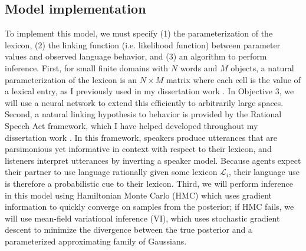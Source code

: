 \subsection{Model implementation}
To implement this model, we must specify (1) the parameterization of the lexicon, (2) the linking function (i.e. likelihood function) between parameter values and observed language behavior, and (3) an algorithm to perform inference.
First, for small finite domains with $N$ words and $M$ objects, a natural parameterization of the lexicon is an $N\times M$ matrix where each cell is the value of a lexical entry, as I previously used in my dissertation work \cite{hawkins_emerging_abstractions_2018}. 
In Objective 3, we will use a neural network to extend this efficiently to arbitrarily large spaces.
Second, a natural linking hypothesis to behavior is provided by the Rational Speech Act framework, which I have helped developed throughout my dissertation work . 
In this framework, speakers produce utterances that are parsimonious yet informative in context with respect to their lexicon, and listeners interpret utterances by inverting a speaker model. 
Because agents expect their partner to use language rationally given some lexicon $\mathcal{L}_i$, their language use is therefore a probabilistic cue to their lexicon.
Third, we will perform inference in this model using Hamiltonian Monte Carlo (HMC) which uses gradient information to quickly converge on samples from the posterior; if HMC fails, we will use mean-field variational inference (VI), which uses stochastic gradient descent to minimize the divergence between the true posterior and a parameterized approximating family of Gaussians.

